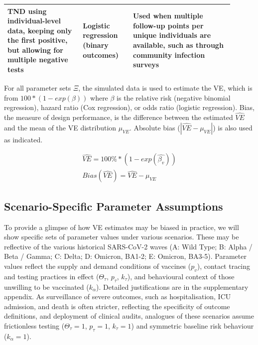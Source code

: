 \documentclass[12pt]{article}
\begin{document}
\begin{table}[H]
\begin{center}
\begin{tabular}{||p{0.3\linewidth}|p{0.2\linewidth}| p{0.4\linewidth}||}
			\hline 
			TND using individual-level data, keeping only the first positive, but allowing for multiple negative tests & Logistic regression (binary outcomes) & Used when multiple follow-up points per unique individuals are available, such as through community infection surveys \citep{bernal2021effectiveness} \\ 
			\hline
			\hline
		\end{tabular}
	\end{center}
\end{table}	

For all parameter sets $\Xi$, the simulated data is used to estimate the VE, which is from $100*(1-exp(\beta))$ where $\beta$ is the relative risk (negative binomial regression), hazard ratio (Cox regression), or odds ratio (logistic regression). Bias, the measure of design performance, is the difference between the estimated $\hat{VE}$ and the mean of the VE distribution $\mu_{VE}$. Absolute bias ($|\hat{VE} - \mu_{VE}|$) is also used as indicated.

\begin{eqnarray}
	\widehat{VE} = 100\% * (1 - exp(\widehat{\beta_v})) \\
	{Bias}(\widehat{VE}) = \widehat{VE} - \mu_{VE}
\end{eqnarray}

\subsection{Scenario-Specific Parameter Assumptions}
To provide a glimpse of how VE estimates may be biased in practice, we will show specific sets of parameter values under various scenarios. These may be reflective of the various historical SARS-CoV-2 waves (A: Wild Type; B: Alpha / Beta / Gamma; C: Delta; D: Omicron, BA1-2; E: Omicron, BA3-5). Parameter values reflect the supply and demand conditions of vaccines ($p_v$), contact tracing and testing practices in effect ($\Theta_{\tau}$, $p_\tau$, $k_\tau$), and behavioural context of those unwilling to be vaccinated ($k_\alpha$). Detailed justifications are in the supplementary appendix. As surveillance of severe outcomes, such as hospitalisation, ICU admission, and death is often stricter, reflecting the specificity of outcome definitions, and deployment of clinical audits, analogues of these scenarios assume frictionless testing ($\Theta_{\tau} = 1$, $p_\tau = 1$, $k_\tau = 1$) and symmetric baseline risk behaviour ($k_\alpha = 1$).
\end{document}
